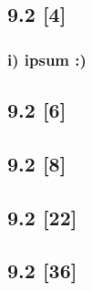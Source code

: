 \documentclass{article}
\begin{document}
\subsection*{9.2 [4]}

\subsubsection*{i) ipsum :)}

\subsection*{9.2 [6]}
\subsection*{9.2 [8]}
\subsection*{9.2 [22]}
\subsection*{9.2 [36]}
\end{document}
